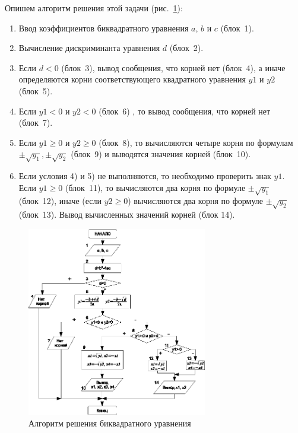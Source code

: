 Опишем алгоритм решения этой задачи (рис.~\ref{ch03:refDrawing19}):
\begin{enumerate}
\item Ввод коэффициентов биквадратного уравнения $a$, $b$ и $c$ (блок~1).
\item Вычисление дискриминанта уравнения $d$ (блок~2).
\item Если $d<0$ (блок~3), вывод сообщения, что корней нет (блок~4), а иначе определяются
корни соответствующего квадратного уравнения $y1$ и $y2$ (блок~5).
\item Если $y1<0$ и $y2<0$ (блок~6) , то вывод сообщения, что корней нет (блок~7).
\item Если $y1\geq 0$ и $y2\geq 0$ (блок~8), то вычисляются четыре корня по формулам  
$\pm\sqrt{y_1}, \pm\sqrt{y_2}$ (блок~9) и выводятся значения корней (блок~10).
\item Если условия 4) и 5) не выполняются, то необходимо проверить знак $y1$. Если
$y1\geq 0$ (блок~11), то вычисляются два корня по формуле  $\pm\sqrt{y_1}$ (блок~12), 
иначе (если  $y2\geq 0$) вычисляются два корня по формуле  $\pm\sqrt{y_2}$ (блок~13). Вывод вычисленных
значений корней (блок 14).
\end{enumerate}

\begin{figure}[ht]
\begin{center}
\includegraphics[width=0.7\textwidth]{img/ris_3_20}
\caption{Алгоритм решения биквадратного уравнения}
\label{ch03:refDrawing19}
\end{center}
\end{figure}

